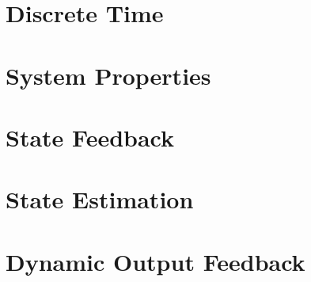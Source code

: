\documentclass[numerate]{cheatsheet}
\author{Noa Sendlhofer - nsendlhofer@ethz.ch}
\begin{document}
\section{Discrete Time}
	
	
	
\section{System Properties}
	
	
	
	
	
\section{State Feedback}
	
	
\section{State Estimation}
	
	
\section{Dynamic Output Feedback}
	
	
\end{document}
